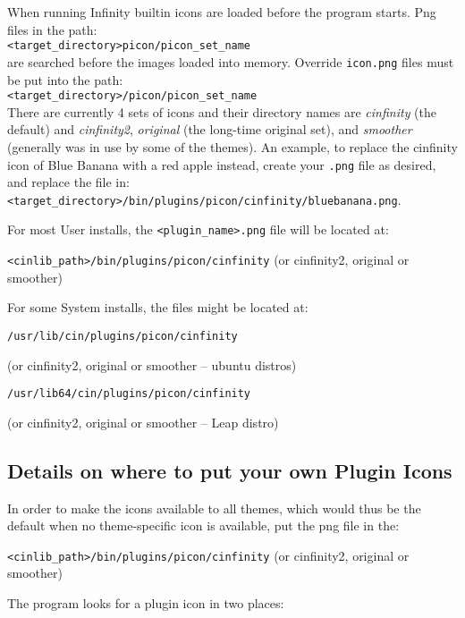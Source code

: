 When running \CGG{} Infinity builtin icons are loaded before the
program starts. Png files in the path:\\
\texttt{<target\_directory>picon/picon\_set\_name}\\
are searched before the images loaded into memory. Override
\texttt{icon.png} files must be put into the path:\\
\texttt{<target\_directory>/picon/picon\_set\_name}\\
There are currently 4 sets of icons and their directory names are
\textit{cinfinity} (the default) and \textit{cinfinity2},
\textit{original} (the long-time original set), and
\textit{smoother} (generally was in use by some of the themes). An
example, to replace the cinfinity icon of Blue Banana with a red
apple instead, create your \texttt{.png} file as desired, and replace the
file in:\\
\texttt{<target\_directory>/bin/plugins/picon/cinfinity/bluebanana.png}.

For most User installs, the \texttt{<plugin\_name>.png} file will be located at:

\texttt{<cinlib\_path>/bin/plugins/picon/cinfinity} (or cinfinity2, original or smoother)

For some System installs, the files might be located at:

\texttt{/usr/lib/cin/plugins/picon/cinfinity}

(or cinfinity2, original or smoother -- ubuntu distros)

\texttt{/usr/lib64/cin/plugins/picon/cinfinity}

(or cinfinity2, original or smoother -- Leap distro)

\subsection{Details on where to put your own Plugin Icons}%
\label{sub:details_put_plugin_icons}

In order to make the icons available to all themes, which would thus be the default when no theme-specific icon is available, put the png file in the:

\texttt{<cinlib\_path>/bin/plugins/picon/cinfinity} (or cinfinity2, original or smoother)

The \CGG{} program looks for a plugin icon in two places:

